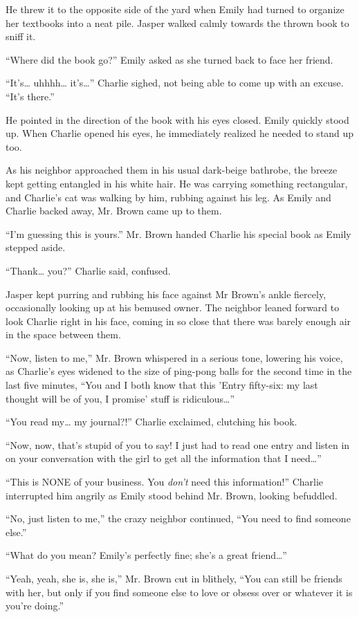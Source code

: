 He threw it to the opposite side of the yard when Emily had turned to organize her textbooks into a neat pile. Jasper walked calmly towards the thrown book to sniff it.

“Where did the book go?” Emily asked as she turned back to face her friend.

“It's… uhhhh… it's…” Charlie sighed, not being able to come up with an excuse. “It's there.”

He pointed in the direction of the book with his eyes closed. Emily quickly stood up. When Charlie opened his eyes, he immediately realized he needed to stand up too.

As his neighbor approached them in his usual dark-beige bathrobe, the breeze kept getting entangled in his white hair. He was carrying something rectangular, and Charlie's cat was walking by him, rubbing against his leg. As Emily and Charlie backed away, Mr. Brown came up to them.

“I'm guessing this is yours.” Mr. Brown handed Charlie his special book as Emily stepped aside.

“Thank… you?” Charlie said, confused.

Jasper kept purring and rubbing his face against Mr Brown's ankle fiercely, occasionally looking up at his bemused owner. The neighbor leaned forward to look Charlie right in his face, coming in so close that there was barely enough air in the space between them.

“Now, listen to me,” Mr. Brown whispered in a serious tone, lowering his voice, as Charlie's eyes widened to the size of ping-pong balls for the second time in the last five minutes, “You and I both know that this 'Entry fifty-six: my last thought will be of you, I promise' stuff is ridiculous…”

“You read my… my journal?!” Charlie exclaimed, clutching his book.

“Now, now, that's stupid of you to say! I just had to read one entry and listen in on your conversation with the girl to get all the information that I need…”

“This is NONE of your business. You \textit{don't} need this information!” Charlie interrupted him angrily as Emily stood behind Mr. Brown, looking befuddled.

“No, just listen to me,” the crazy neighbor continued, “You need to find someone else.”

“What do you mean? Emily's perfectly fine; she's a great friend…”

“Yeah, yeah, she is, she is,” Mr. Brown cut in blithely, “You can still be friends with her, but only if you find someone else to love or obsess over or whatever it is you're doing.”

